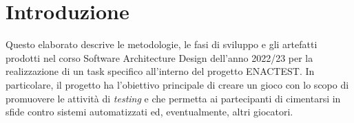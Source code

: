 \documentclass{article}
\begin{document}

\section{Introduzione}
Questo elaborato descrive le metodologie, le fasi di sviluppo e gli artefatti prodotti nel corso Software Architecture Design dell'anno 2022/23 per la realizzazione di un task specifico all'interno del progetto ENACTEST. In particolare, il progetto ha l'obiettivo principale di creare un gioco con lo scopo di promuovere le attività di \textit{testing} e che permetta ai partecipanti di cimentarsi in sfide contro sistemi automatizzati ed, eventualmente, altri giocatori.
\end{document}
